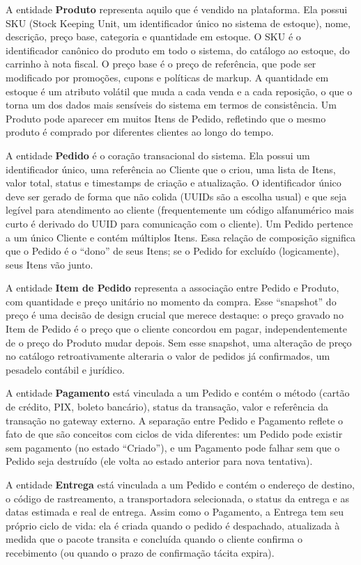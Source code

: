 A entidade \textbf{Produto} representa aquilo que é vendido na plataforma. Ela
possui SKU (Stock Keeping Unit, um identificador único no sistema de estoque),
nome, descrição, preço base, categoria e quantidade em estoque. O SKU é o
identificador canônico do produto em todo o sistema, do catálogo ao estoque, do
carrinho à nota fiscal. O preço base é o preço de referência, que pode ser
modificado por promoções, cupons e políticas de markup. A quantidade em estoque é
um atributo volátil que muda a cada venda e a cada reposição, o que o torna um
dos dados mais sensíveis do sistema em termos de consistência. Um Produto pode
aparecer em muitos Itens de Pedido, refletindo que o mesmo produto é comprado por
diferentes clientes ao longo do tempo.

A entidade \textbf{Pedido} é o coração transacional do sistema. Ela possui um
identificador único, uma referência ao Cliente que o criou, uma lista de Itens,
valor total, status e timestamps de criação e atualização. O identificador único
deve ser gerado de forma que não colida (UUIDs são a escolha usual) e que seja
legível para atendimento ao cliente (frequentemente um código alfanumérico mais
curto é derivado do UUID para comunicação com o cliente). Um Pedido pertence a um
único Cliente e contém múltiplos Itens. Essa relação de composição significa que
o Pedido é o ``dono'' de seus Itens; se o Pedido for excluído (logicamente), seus
Itens vão junto.

A entidade \textbf{Item de Pedido} representa a associação entre Pedido e Produto,
com quantidade e preço unitário no momento da compra. Esse ``snapshot'' do preço é
uma decisão de design crucial que merece destaque: o preço gravado no Item de Pedido
é o preço que o cliente concordou em pagar, independentemente de o preço do Produto
mudar depois. Sem esse snapshot, uma alteração de preço no catálogo retroativamente
alteraria o valor de pedidos já confirmados, um pesadelo contábil e jurídico.

A entidade \textbf{Pagamento} está vinculada a um Pedido e contém o método
(cartão de crédito, PIX, boleto bancário), status da transação, valor e referência
da transação no gateway externo. A separação entre Pedido e Pagamento reflete o fato
de que são conceitos com ciclos de vida diferentes: um Pedido pode existir sem
pagamento (no estado ``Criado''), e um Pagamento pode falhar sem que o Pedido
seja destruído (ele volta ao estado anterior para nova tentativa).

A entidade \textbf{Entrega} está vinculada a um Pedido e contém o endereço de
destino, o código de rastreamento, a transportadora selecionada, o status da
entrega e as datas estimada e real de entrega. Assim como o Pagamento, a Entrega
tem seu próprio ciclo de vida: ela é criada quando o pedido é despachado,
atualizada à medida que o pacote transita e concluída quando o cliente confirma o
recebimento (ou quando o prazo de confirmação tácita expira).


